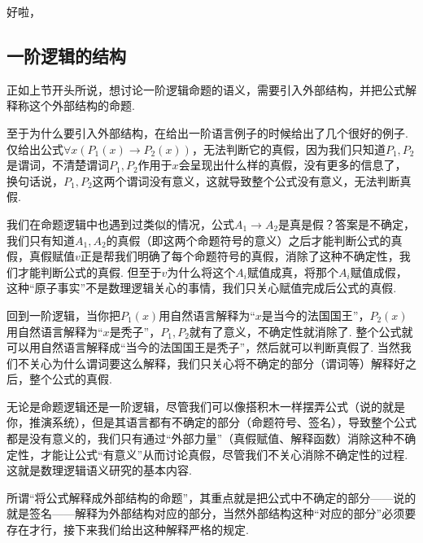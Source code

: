 \documentclass[main.tex]{subfiles}
\begin{document}
好啦，

\subsection{一阶逻辑的结构}

正如上节开头所说，想讨论一阶逻辑命题的语义，需要引入外部结构，并把公式解释称这个外部结构的命题. 

\begin{note}
    至于为什么要引入外部结构，在给出一阶语言例子的时候给出了几个很好的例子. 仅给出公式\(\forall x (P_1(x) \to P_2(x))\)，无法判断它的真假，因为我们只知道\(P_1,P_2\)是谓词，不清楚谓词\(P_1,P_2\)作用于\(x\)会呈现出什么样的真假，没有更多的信息了，换句话说，\(P_1,P_2\)这两个谓词没有意义，这就导致整个公式没有意义，无法判断真假. 
    
    我们在命题逻辑中也遇到过类似的情况，公式\(A_1 \to A_2\)是真是假？答案是不确定，我们只有知道\(A_1, A_2\)的真假（即这两个命题符号的意义）之后才能判断公式的真假，真假赋值\(v\)正是帮我们明确了每个命题符号的真假，消除了这种不确定性，我们才能判断公式的真假. 但至于\(v\)为什么将这个\(A_i\)赋值成真，将那个\(A_i\)赋值成假，这种“原子事实”不是数理逻辑关心的事情，我们只关心赋值完成后公式的真假. 
    
    回到一阶逻辑，当你把\(P_1(x)\)用自然语言解释为“\(x\)是当今的法国国王”，\(P_2(x)\)用自然语言解释为“\(x\)是秃子”，\(P_1,P_2\)就有了意义，不确定性就消除了. 整个公式就可以用自然语言解释成“当今的法国国王是秃子”，然后就可以判断真假了. 当然我们不关心为什么谓词要这么解释，我们只关心将不确定的部分（谓词等）解释好之后，整个公式的真假.

    无论是命题逻辑还是一阶逻辑，尽管我们可以像搭积木一样摆弄公式（说的就是你，推演系统），但是其语言都有不确定的部分（命题符号、签名），导致整个公式都是没有意义的，我们只有通过“外部力量”（真假赋值、解释函数）消除这种不确定性，才能让公式“有意义”从而讨论真假，尽管我们不关心消除不确定性的过程. 这就是数理逻辑语义研究的基本内容.
\end{note}

所谓“将公式解释成外部结构的命题”，其重点就是把公式中不确定的部分——说的就是签名——解释为外部结构对应的部分，当然外部结构这种“对应的部分”必须要存在才行，接下来我们给出这种解释严格的规定.
\end{document}
